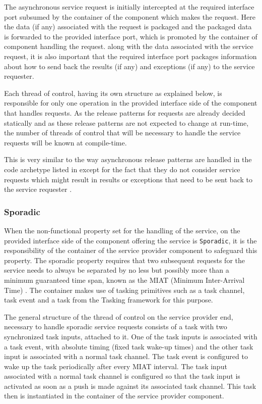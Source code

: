 The asynchronous service request is initially intercepted at the required interface port subsumed by the container of the component which makes the request. Here the data (if any) associated with the request is packaged and the packaged data is forwarded to the provided interface port, which is promoted by the container of component handling the request. along with the data associated with the service request, it is also important that the required interface port packages information about how to send back the results (if any) and exceptions (if any) to the service requester.

Each thread of control, having its own structure as explained below, is responsible for only one operation in the provided interface side of the component that handles requests. As the release patterns for requests are already decided statically and as these release patterns are not expected to change at run-time, the number of threads of control that will be necessary to handle the service requests will be known at compile-time.

This is very similar to the way asynchronous release patterns are handled in the code archetype listed in \cite{CharEvoRAVCodeAr,EvoRAVCodeAr} except for the fact that they do not consider service requests which might result in results or exceptions that need to be sent back to the service requester \cite{CharEvoRAVCodeAr}.  

\subsubsection{\textbf{Sporadic}}
When the non-functional property set for the handling of the service, on the provided interface side of the component offering the service is \texttt{Sporadic}, it is the responsibility of the container of the service provider component to safeguard this property. The sporadic property requires that two subsequent requests for the service needs to always be separated by no less but possibly more than a minimum guaranteed time span, known as the MIAT (Minimum Inter-Arrival Time) \cite{SpecMetamodel,CompBasedProcess}. The container makes use of tasking primitives such as a task channel, task event and a task from the Tasking framework for this purpose.

The general structure of the thread of control on the service provider end, necessary to handle sporadic service requests consists of a task with two synchronized task inputs, attached to it. One of the task inputs is associated with a task event, with absolute timing (fixed task wake-up times) and the other task input is associated with a normal task channel. The task event is configured to wake up the task periodically after every MIAT interval. The task input associated with a normal task channel is configured so that the task input is activated as soon as a push is made against its associated task channel. This task then is instantiated in the container of the service provider component.  

